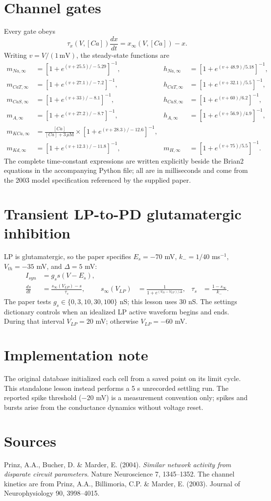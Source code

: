 \documentclass[10pt,a4paper]{article}
\begin{document}
\section*{Channel gates}
Every gate obeys
\begin{equation}
\tau_x(V,[Ca])\frac{dx}{dt}=x_\infty(V,[Ca])-x.
\end{equation}
Writing $v=V/(1\,\mathrm{mV})$, the steady-state functions are
\begin{align*}
m_{Na,\infty}&=[1+e^{(v+25.5)/-5.29}]^{-1},&
h_{Na,\infty}&=[1+e^{(v+48.9)/5.18}]^{-1},\\
m_{CaT,\infty}&=[1+e^{(v+27.1)/-7.2}]^{-1},&
h_{CaT,\infty}&=[1+e^{(v+32.1)/5.5}]^{-1},\\
m_{CaS,\infty}&=[1+e^{(v+33)/-8.1}]^{-1},&
h_{CaS,\infty}&=[1+e^{(v+60)/6.2}]^{-1},\\
m_{A,\infty}&=[1+e^{(v+27.2)/-8.7}]^{-1},&
h_{A,\infty}&=[1+e^{(v+56.9)/4.9}]^{-1},\\
m_{KCa,\infty}&=\frac{[Ca]}{[Ca]+3\,\mu\mathrm{M}}\times
[1+e^{(v+28.3)/-12.6}]^{-1},\\
m_{Kd,\infty}&=[1+e^{(v+12.3)/-11.8}]^{-1},&
m_{H,\infty}&=[1+e^{(v+75)/5.5}]^{-1}.
\end{align*}
The complete time-constant expressions are written explicitly beside the
Brian2 equations in the accompanying Python file; all are in milliseconds and
come from the 2003 model specification referenced by the supplied paper.

\section*{Transient LP-to-PD glutamatergic inhibition}
LP is glutamatergic, so the paper specifies $E_s=-70$ mV,
$k_-=1/40$ ms$^{-1}$, $V_{th}=-35$ mV, and $\Delta=5$ mV:
\begin{align}
I_{syn}&=g_s s(V-E_s),\\
\frac{ds}{dt}&=\frac{s_\infty(V_{LP})-s}{\tau_s},&
s_\infty(V_{LP})&=\frac{1}{1+e^{(V_{th}-V_{LP})/\Delta}},&
\tau_s&=\frac{1-s_\infty}{k_-}.
\end{align}
The paper tests $g_s\in\{0,3,10,30,100\}$ nS; this lesson uses 30 nS.
The settings dictionary controls when an idealized LP active waveform begins
and ends. During that interval $V_{LP}=20$ mV; otherwise $V_{LP}=-60$ mV.

\section*{Implementation note}
The original database initialized each cell from a saved point on its limit
cycle. This standalone lesson instead performs a 5 s unrecorded settling run.
The reported spike threshold ($-20$ mV) is a measurement convention only;
spikes and bursts arise from the conductance dynamics without voltage reset.

\section*{Sources}
Prinz, A.A., Bucher, D. \& Marder, E. (2004). \emph{Similar network activity
from disparate circuit parameters}. Nature Neuroscience 7, 1345--1352.
The channel kinetics are from Prinz, A.A., Billimoria, C.P. \& Marder, E.
(2003). Journal of Neurophysiology 90, 3998--4015.
\end{document}
